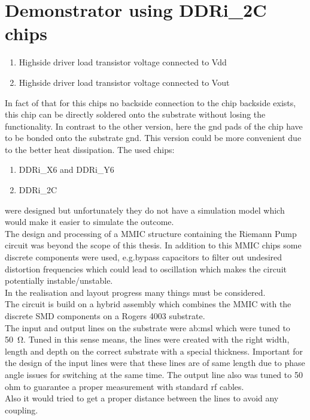 \section{Demonstrator using DDRi\_2C chips}
\begin{enumerate}
	\item Highside driver load transistor voltage connected to Vdd
	\item Highside driver load transistor voltage connected to Vout
\end{enumerate}
In fact of that for this chips no backside connection to the chip backside exists, this chip can be directly soldered onto the substrate without losing the functionality.
In contrast to the other version, here the gnd pads of the chip have to be bonded onto the substrate gnd. This version could be more convenient due to the better heat dissipation.
The used chips:
\begin{enumerate}
	\item DDRi\_X6 and DDRi\_Y6
	\item DDRi\_2C
\end{enumerate}
were designed but unfortunately they do not have a simulation model which would make it easier to simulate the outcome. \\
The design and processing of a MMIC structure containing the Riemann Pump circuit was beyond the scope of this thesis.
In addition to this MMIC chips some discrete components were used, e.g.bypass capacitors to filter out undesired distortion frequencies which could lead to oscillation which makes the circuit potentially instable/unstable.\\
In the realisation and layout progress many things must be considered.\\
The circuit is build on a hybrid assembly which combines the MMIC with the discrete SMD components on a Rogers 4003 substrate.\\
The input and output lines on the substrate were \gls{ab:msl} which were tuned to \SI{50}{\ohm}.
Tuned in this sense means, the lines were created with the right width, length and depth on the correct substrate with a special thickness.
Important for the design of the input lines were that these lines are of same length due to phase angle issues for switching at the same time. 
The output line also was tuned to 50 ohm to guarantee a proper measurement with standard rf cables.\\
Also it would tried to get a proper distance between the lines to avoid any coupling. \\
